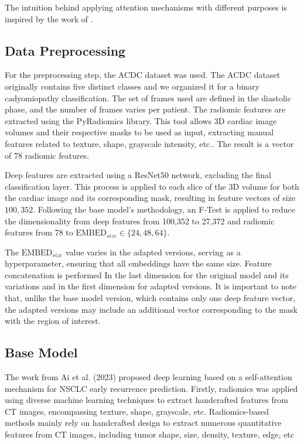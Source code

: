 \documentclass[journal,twoside,web]{ieeecolor}
\begin{document}
The intuition behind applying attention mechanisms with different purposes is inspired by the work of \cite{yangNeuralNetworkDesign2024a}.


\subsection{Data Preprocessing}

For the preprocessing step, the ACDC dataset was used. The ACDC dataset originally contains five distinct classes and we organized it for a binary cadyomiopathy classification. The set of frames used are defined in the diastolic phase, and the number of frames varies per patient. The radiomic features are extracted using the PyRadiomics library. This tool allows 3D cardiac image volumes and their respective masks to be used as input, extracting manual features related to texture, shape, grayscale intensity, etc.. The result is a vector of $78$ radiomic features.

Deep features are extracted using a ResNet50 network, excluding the final classification layer. This process is applied to each slice of the 3D volume for both the cardiac image and its corresponding mask, resulting in feature vectors of size $100,352$. Following the base model's methodology, an F-Test is applied to reduce the dimensionality from deep features from 100,352 to 27,372 and radiomic features from 78 to $\text{EMBED}_{size} \in \{24, 48, 64\}$.

The $\text{EMBED}_{size}$ value varies in the adapted versions, serving as a hyperparameter, ensuring that all embeddings have the same size. Feature concatenation is performed In the last dimension for the original model and its variations and in the first dimension for adapted versions. It is important to note that, unlike the base model version, which contains only one deep feature vector, the adapted versions may include an additional vector corresponding to the mask with the region of interest.

\subsection{Base Model}

The work from Ai et al. (2023) proposed deep learning based on a self-attention mechanism for \gls{NSCLC} early recurrence prediction. Firstly, radiomics was applied using diverse machine learning techniques to extract handcrafted features from \gls{CT} images, encompassing texture, shape, grayscale, etc. Radiomics-based methods mainly rely on handcrafted design to extract numerous quantitative  features from \gls{CT} images, including tumor shape, size, density,  texture, edge, etc \cite{aiSelfAttentionBasedFusion2023}
\end{document}

